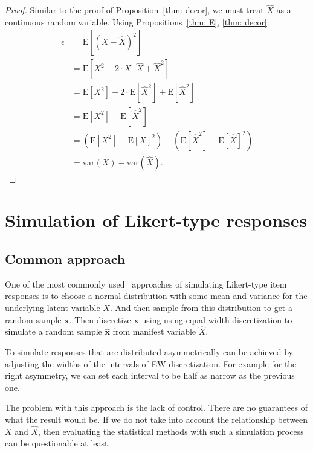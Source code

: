 \documentclass[10pt]{article}
\renewcommand{\vec}[1]{\mathbf{#1}}
\begin{document}
\begin{proof}
Similar to the proof of Proposition~\ref{thm: decor}, we must treat $\hat{X}$ as a continuous random variable. Using Propositions~\ref{thm: E}, \ref{thm: decor}:
\begin{align*}
\epsilon &= \mathrm{E}[ \left( X - \hat{X} \right)^{2} ] \\
&= \mathrm{E}[X^{2} - 2\cdot X \cdot \hat{X} + \hat{X}^{2}] \\
&= \mathrm{E}[X^{2}] - 2 \cdot \mathrm{E}[\hat{X}^{2}] + \mathrm{E}[\hat{X}^{2}] \\ 
&= \mathrm{E}[X^{2}] - \mathrm{E}[\hat{X}^{2}] \\ 
&= \left( \mathrm{E}[X^{2}] - \mathrm{E}[X]^{2} \right) - 
\left( \mathrm{E}[\hat{X}^{2}] - \mathrm{E}[\hat{X}]^{2} \right) \\
&= \mathrm{var}(X) - \mathrm{var}(\hat{X}).
\end{align*}
\end{proof}


\section{Simulation of Likert-type responses} \label{sec: simulation_likert}

\subsection{Common approach}

One of the most commonly used~\cite{Wu} approaches of simulating Likert-type item responses is to choose a normal distribution with some mean and variance for the underlying latent variable $X$. And then sample from this distribution to get a random sample $\vec{x}$. Then discretize $\vec{x}$ using using equal width discretization to simulate a random sample $\hat{\vec{x}}$ from manifest variable $\hat{X}$.

To simulate responses that are distributed asymmetrically can be achieved by adjusting the widths of the intervals of EW discretization. For example for the right asymmetry, we can set each interval to be half as narrow as the previous one. 

The problem with this approach is the lack of control. There are no guarantees of what the result would be. If we do not take into account the relationship between $X$ and $\hat{X}$, then evaluating the statistical methods with such a simulation process can be questionable at least.
\end{document}
